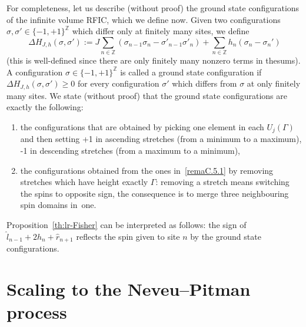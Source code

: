 \documentclass[AHL,Unicode,longabstracts,published]{cedram}
\newcommand{\Z}{\mathbb{Z}}
\newcommand{\gG}{\Gamma}
\newcommand{\ls}{\widehat{l}}
\newcommand{\rs}{\widehat{r}}
\begin{document}
\begin{rema}\label{rem-descrground}
For completeness, let us describe (without proof) the ground state configurations of the infinite volume RFIC, which we define now. Given two configurations $\sigma, \sigma'\in \{-1, +1 \}^\Z$ which differ only at finitely many sites, we define
\[
\Delta H_{J, h} (\sigma, \sigma'):= J\sum_{n\in \Z} \left(\sigma_{n-1} \sigma_n - \sigma'_{n-1} \sigma'_n \right) + \sum_{n\in \Z} h_n \left(\sigma_n -\sigma_n'\right)
\]
(this is well-defined since there are only finitely many nonzero terms in the\linebreak sums). A configuration {$\sigma \in  \{-1, +1\}^\Z$} is called a ground state configuration if $\Delta H_{J, h} (\sigma, \sigma') \ge 0$ for every configuration $\sigma'$ which differs from $\sigma$ at only finitely many sites. We state (without proof) that the ground state configurations are exactly the following:
\begin{enumerate}
\item\label{remaC.5.1} the configurations that are obtained by picking one element in each $U_j(\gG)$ and then setting +1 in ascending stretches (from a minimum to a maximum), -1 in descending stretches (from a maximum to a minimum),
\item\label{remaC.5.2} the configurations obtained from the ones in~\eqref{remaC.5.1} by removing stretches which have height exactly $\gG$: removing a stretch means switching the spins to opposite sign, the consequence is to merge three neighbouring spin domains in~one.
\end{enumerate}
Proposition~\ref{th:lr-Fisher} can be interpreted as follows: the sign of $\ls_{ n-1}+2 h_n + \rs_{n+1}$ reflects the spin given to site $n$ by the ground state configurations.
\end{rema}



\section{Scaling to the Neveu--Pitman process}\label{sec:scaling}
\end{document}
